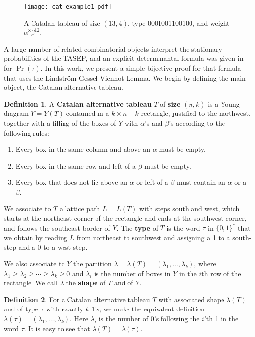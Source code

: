 \documentclass[11pt]{article}
\numberwithin{equation}{section}
\theoremstyle{plain}
\theoremstyle{definition}
\newtheorem{defn}{Definition}[section]
\theoremstyle{remark}
\begin{document}
\begin{wrapfigure}[9]{r}{0.33\textwidth}
\centering
\texttt{[image: cat\_example1.pdf]}
\caption{A Catalan tableau of size $(13,4)$, type 0001001100100, and weight $\alpha^8\beta^{12}$.}
\noindent
\label{cat_example}
\end{wrapfigure}

A large number of related combinatorial objects interpret the stationary probabilities of the TASEP, and an explicit determinantal formula was given in \cite{mandelshtam} for $\Pr(\tau)$. In this work, we present a simple bijective proof for that formula that uses the Lindstr\"{o}m-Gessel-Viennot Lemma. We begin by defining the main object, the Catalan alternative tableau. 

\begin{defn}\label{catalan}
A \textbf{Catalan alternative tableau} $T$ of \textbf{size} $(n,k)$ is a Young diagram $Y=Y(T)$ contained in a $k \times n-k$ rectangle, justified to the northwest, together with a filling of the boxes of $Y$ with $\alpha$'s and $\beta$'s according to the following rules:
\begin{enumerate}[i]
\item Every box in the same column and above an $\alpha$ must be empty.
\item Every box in the same row and left of a $\beta$ must be empty.
\item Every box that does not lie above an $\alpha$ or left of a $\beta$ must contain an $\alpha$ or a $\beta$.
\end{enumerate}
\end{defn}

We associate to $T$ a lattice path $L=L(T)$ with steps south and west, which starts at the northeast corner of the rectangle and ends at the southwest corner, and follows the southeast border of $Y$. The \textbf{type} of $T$ is the word $\tau$ in $\{0,1\}^{\ast}$ that we obtain by reading $L$ from northeast to southwest and assigning a 1 to a south-step and a 0 to a west-step.

We also associate to $Y$ the partition $\lambda=\lambda(T)=(\lambda_1,\ldots,\lambda_k)$, where $\lambda_1 \geq \lambda_2 \geq \cdots \geq \lambda_k \geq 0$ and $\lambda_i$ is the number of boxes in $Y$ in the $i$th row of the rectangle. We call $\lambda$ the \textbf{shape} of $T$ and of $Y$. 

\begin{defn}
For a Catalan alternative tableau $T$ with associated shape $\lambda(T)$ and of type $\tau$ with exactly $k$ 1's, we make the equivalent definition $\lambda(\tau)=(\lambda_1,\ldots,\lambda_k)$.  Here $\lambda_i$ is the number of 0's following the $i$'th 1 in the word $\tau$. It is easy to see that $\lambda(T) = \lambda(\tau)$.
\end{defn}
\end{document}
